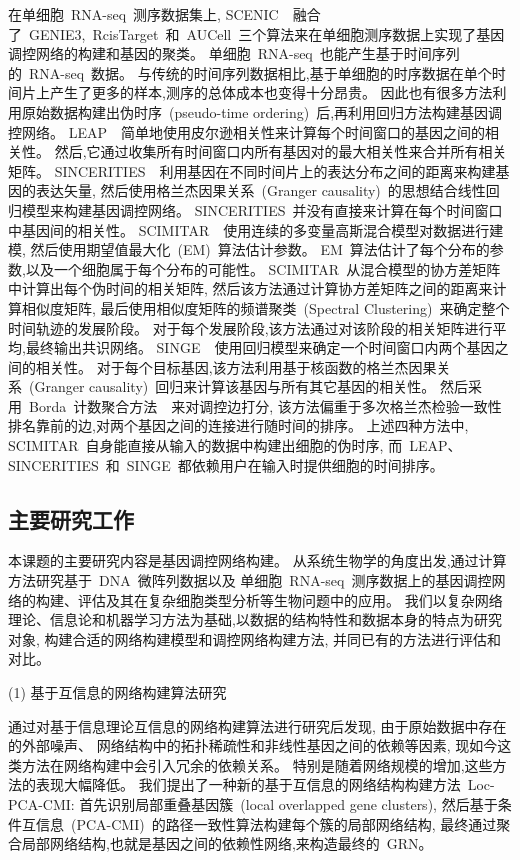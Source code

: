 在单细胞~RNA-seq~测序数据集上, 
SCENIC~\cite{aibar2017scenic}~融合了~GENIE3,~RcisTarget~和~AUCell~三个算法来在单细胞测序数据上实现了基因调控网络的构建和基因的聚类。
单细胞~RNA-seq~也能产生基于时间序列的~RNA-seq~数据。
与传统的时间序列数据相比,基于单细胞的时序数据在单个时间片上产生了更多的样本,测序的总体成本也变得十分昂贵。
因此也有很多方法利用原始数据构建出伪时序~(pseudo-time ordering)~后,再利用回归方法构建基因调控网络。
LEAP~\cite{specht2017leap}~简单地使用皮尔逊相关性来计算每个时间窗口的基因之间的相关性。 
然后,它通过收集所有时间窗口内所有基因对的最大相关性来合并所有相关矩阵。
SINCERITIES~\cite{papili2017sincerities}~利用基因在不同时间片上的表达分布之间的距离来构建基因的表达矢量,
然后使用格兰杰因果关系~(Granger causality)~的思想结合线性回归模型来构建基因调控网络。
SINCERITIES~并没有直接来计算在每个时间窗口中基因间的相关性。
SCIMITAR~\cite{cordero2017tracing}~使用连续的多变量高斯混合模型对数据进行建模,
然后使用期望值最大化~(EM)~算法估计参数。
EM~算法估计了每个分布的参数,以及一个细胞属于每个分布的可能性。
SCIMITAR~从混合模型的协方差矩阵中计算出每个伪时间的相关矩阵,
然后该方法通过计算协方差矩阵之间的距离来计算相似度矩阵,
最后使用相似度矩阵的频谱聚类~(Spectral Clustering)~来确定整个时间轨迹的发展阶段。
对于每个发展阶段,该方法通过对该阶段的相关矩阵进行平均,最终输出共识网络。
SINGE~\cite{deshpande2019network}~使用回归模型来确定一个时间窗口内两个基因之间的相关性。
对于每个目标基因,该方法利用基于核函数的格兰杰因果关系~(Granger causality)~回归来计算该基因与所有其它基因的相关性。
然后采用~Borda~计数聚合方法~\cite{van2000variants}~来对调控边打分,
该方法偏重于多次格兰杰检验一致性排名靠前的边,对两个基因之间的连接进行随时间的排序。
上述四种方法中, SCIMITAR~自身能直接从输入的数据中构建出细胞的伪时序, 
而~LEAP、SINCERITIES~和~SINGE~都依赖用户在输入时提供细胞的时间排序。

\subsection{主要研究工作}
本课题的主要研究内容是基因调控网络构建。
从系统生物学的角度出发,通过计算方法研究基于~DNA~微阵列数据以及
单细胞~RNA-seq~测序数据上的基因调控网络的构建、评估及其在复杂细胞类型分析等生物问题中的应用。
我们以复杂网络理论、信息论和机器学习方法为基础,以数据的结构特性和数据本身的特点为研究对象,
构建合适的网络构建模型和调控网络构建方法,
并同已有的方法进行评估和对比。

(1) 基于互信息的网络构建算法研究

通过对基于信息理论互信息的网络构建算法进行研究后发现,
由于原始数据中存在的外部噪声、
网络结构中的拓扑稀疏性和非线性基因之间的依赖等因素,
现如今这类方法在网络构建中会引入冗余的依赖关系。
特别是随着网络规模的增加,这些方法的表现大幅降低。
我们提出了一种新的基于互信息的网络结构构建方法~Loc-PCA-CMI:
首先识别局部重叠基因簇~(local overlapped gene clusters),
然后基于条件互信息~(PCA-CMI)~的路径一致性算法构建每个簇的局部网络结构,
最终通过聚合局部网络结构,也就是基因之间的依赖性网络,来构造最终的~GRN。

